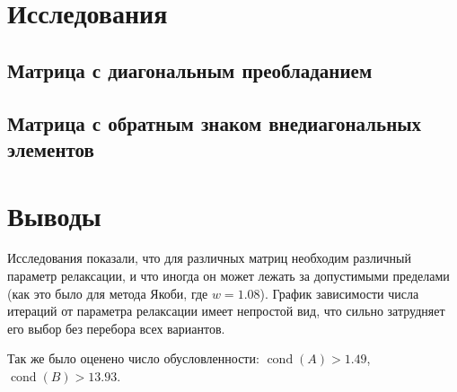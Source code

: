 
\section{Исследования}

\subsection{Матрица с диагональным преобладанием}


\subsection{Матрица с обратным знаком внедиагональных элементов}


\section{Выводы}

Исследования показали, что для различных матриц необходим различный параметр релаксации, и что иногда он может лежать за допустимыми пределами (как это было для метода Якоби, где $w = 1.08$). График зависимости числа итераций от параметра релаксации имеет непростой вид, что сильно затрудняет его выбор без перебора всех вариантов.

Так же было оценено число обусловленности: $ \mathop{cond}(A) > 1.49 $, $ \mathop{cond}(B) > 13.93 $.
